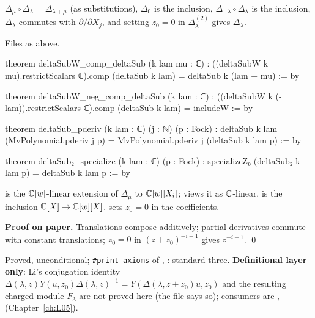 \begin{theorem}\label{l11:thm:lidelta}
$\Delta_\mu\circ\Delta_\lambda = \Delta_{\lambda+\mu}$ (as substitutions), $\Delta_0$ is the inclusion, $\Delta_{-\lambda}\circ\Delta_\lambda$ is the
inclusion, $\Delta_\lambda$ commutes with $\partial/\partial X_j$, and setting $z_0 = 0$ in $\Delta^{(2)}_\lambda$ gives $\Delta_\lambda$.
\end{theorem}
\noindent Files as above.
\begin{leancode}
theorem deltaSubW_comp_deltaSub (k lam mu : ℂ) :
    ((deltaSubW k mu).restrictScalars ℂ).comp (deltaSub k lam) = deltaSub k (lam + mu) := by

theorem deltaSubW_neg_comp_deltaSub (k lam : ℂ) :
    ((deltaSubW k (-lam)).restrictScalars ℂ).comp (deltaSub k lam) = includeW := by

theorem deltaSub_pderiv (k lam : ℂ) (j : ℕ) (p : Fock) :
    deltaSub k lam (MvPolynomial.pderiv j p)
      = MvPolynomial.pderiv j (deltaSub k lam p) := by

theorem deltaSub₂_specialize (k lam : ℂ) (p : Fock) :
    specializeZ₀ (deltaSub₂ k lam p) = deltaSub k lam p := by
\end{leancode}

\begin{dictionary}
 is the ${\mathbb{C}}[w]$-linear extension of $\Delta_\mu$ to ${\mathbb{C}}[w][X_i]$;  views it as ${\mathbb{C}}$-linear.
 is the inclusion ${\mathbb{C}}[X]\to{\mathbb{C}}[w][X]$.  sets $z_0 = 0$ in the coefficients.
\end{dictionary}

\textbf{Proof on paper.} Translations compose additively; partial derivatives commute with constant translations; $z_0 = 0$ in
$(z+z_0)^{-i-1}$ gives $z^{-i-1}$. \qed

\begin{status}
Proved, unconditional; \texttt{\#print axioms} of \allowbreak{}\allowbreak{}\allowbreak{},
\allowbreak{}\allowbreak{}\allowbreak{}\allowbreak{}: standard three. \textbf{Definitional layer only}: Li's conjugation identity
$\Delta(\lambda,z)Y(u,z_0)\Delta(\lambda,z)^{-1} = Y(\Delta(\lambda,z+z_0)u,z_0)$ and the resulting charged module $F_\lambda$ are not proved
here (the file says so); consumers are ,  (Chapter~\ref{ch:L05}).
\end{status}

